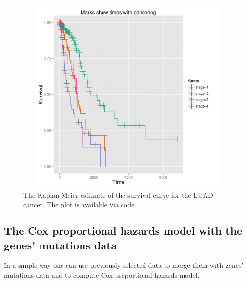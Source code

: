 \begin{figure}[h!]
\includegraphics[width=14cm, height=10cm]{km_plot_luad.pdf}
\caption{\label{km_plot}The Kaplan-Meier estimate of the survival curve for the LUAD cancer. The plot is available via code }
\end{figure}

\newpage

\subsection{The Cox proportional hazards model with the genes' mutations
data}\label{the-cox-proportional-hazards-model-with-the-genes-mutations-data}

In a simple way one can use previously selected data to merge them with
genes' mutations data and to compute Cox proportional hazards model.

